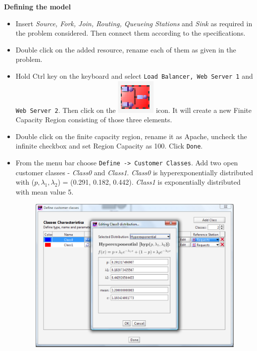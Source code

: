 {\large{\textbf{Defining the model}}}
\begin{itemize}
\item Insert \emph{Source, Fork, Join, Routing, Queueing Stations}
and \emph{Sink} as required in the problem considered. Then
connect them according to the specifications. \item Double click
on the added resource, rename each of them as given in the
problem. \item Hold Ctrl key on the keyboard and select
\texttt{Load Balancer, Web Server 1} and \texttt{Web Server 2}.
Then click on the
\includegraphics[scale=.5]{img/jsimg/addStationToNFCR}
icon. It will create a new Finite Capacity Region consisting of
those three elements. \item Double click on the finite capacity
region, rename it as Apache, uncheck the infinite checkbox and set
Region Capacity as 100. Click \texttt{Done}. \item From the menu
bar choose \texttt{Define -> Customer Classes}. Add two open
customer classes - \emph{Class0} and \emph{Class1}. \emph{Class0}
is hyperexponentially distributed with ($p, \lambda_1, \lambda_2$)
= (0.291, 0.182, 0.442). \emph{Class1} is exponentially
distributed with mean value 5.
\begin{figure}[htb]
    \begin{center}
        \includegraphics[scale=.5]{img/jsimg/12.18.eps}
    \end{center}

\end{figure}
\end{itemize}
